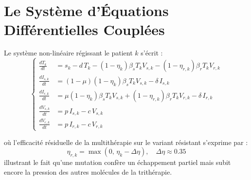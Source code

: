 \documentclass[11pt,a4paper]{report}
\theoremstyle{plain}
\theoremstyle{definition}
\theoremstyle{remark}
\begin{document}
\section{Le Système d'Équations Différentielles Couplées}
Le système non-linéaire régissant le patient $k$ s'écrit :
\begin{equation}
\label{eq:hiv_system}
\left\{
\begin{aligned}
\frac{d T_k}{dt} &= s_k - d \, T_k - (1 - \eta_k) \beta_s T_k V_{s,k} - (1 - \eta_{r,k}) \beta_r T_k V_{r,k} \\[4pt]
\frac{d I_{s,k}}{dt} &= (1 - \mu) (1 - \eta_k) \beta_s T_k V_{s,k} - \delta \, I_{s,k} \\[4pt]
\frac{d I_{r,k}}{dt} &= \mu (1 - \eta_k) \beta_s T_k V_{s,k} + (1 - \eta_{r,k}) \beta_r T_k V_{r,k} - \delta \, I_{r,k} \\[4pt]
\frac{d V_{s,k}}{dt} &= p \, I_{s,k} - c \, V_{s,k} \\[4pt]
\frac{d V_{r,k}}{dt} &= p \, I_{r,k} - c \, V_{r,k}
\end{aligned}
\right.
\end{equation}

\noindent où l'efficacité résiduelle de la multithérapie sur le variant résistant s'exprime par :
\begin{equation}
\eta_{r,k} = \max\left(0, \, \eta_k - \Delta \eta\right), \quad \Delta \eta \approx 0.35
\end{equation}
illustrant le fait qu'une mutation confère un échappement partiel mais subit encore la pression des autres molécules de la trithérapie.
\end{document}
